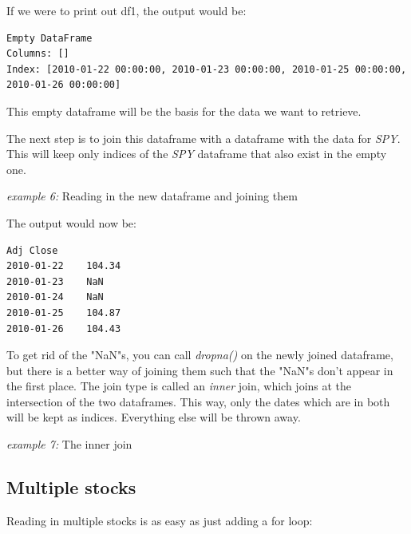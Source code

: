 \noindent If we were to print out df1, the output would be:
\begin{lstlisting}[style=python]
Empty DataFrame
Columns: []
Index: [2010-01-22 00:00:00, 2010-01-23 00:00:00, 2010-01-25 00:00:00, 2010-01-26 00:00:00]
\end{lstlisting}

\noindent This empty dataframe will be the basis for the data we want
to retrieve.

\noindent The next step is to join this dataframe with a dataframe
with the data for \textit{SPY}. This will keep only indices of the
\textit{SPY} dataframe that also exist in the empty one.\\

\noindent
\begin{minipage}{\linewidth}
  \noindent\textit{example 6:} Reading in the new dataframe and joining them

  
\end{minipage}

\noindent
\begin{minipage}{\linewidth}
  \noindent The output would now be:
\begin{lstlisting}[style=python]
        Adj Close
2010-01-22    104.34
2010-01-23    NaN
2010-01-24    NaN
2010-01-25    104.87
2010-01-26    104.43
\end{lstlisting}
\end{minipage}

\noindent To get rid of the "NaN"s, you can call \textit{dropna()} on
the newly joined dataframe, but there is a better way of joining them
such that the "NaN"s don't appear in the first place. The join type
is called an \textit{inner} join, which joins at the intersection of
the two dataframes. This way, only the dates which are in both will
be kept as indices. Everything else will be thrown away.\\

\noindent
\begin{minipage}{\linewidth}
  \noindent\textit{example 7:} The inner join

  
\end{minipage}

\subsection{Multiple stocks}
\noindent Reading in multiple stocks is as easy as just adding a for loop:\\

